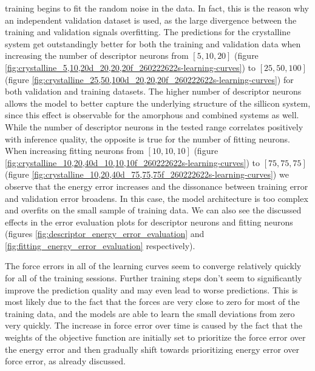 training begins to fit the random noise in the data. In fact, this is the
reason why an independent validation dataset is used, as the large divergence
between the training and validation signals overfitting.
The predictions for the crystalline system get outstandingly better for both
the training and validation data when increasing the number of descriptor
neurons from $[5, 10, 20]$ (figure
\ref{fig:crystalline_5,10,20d_20,20,20f_260222622s-learning-curves}) to
$[25, 50, 100]$ (figure
\ref{fig:crystalline_25,50,100d_20,20,20f_260222622s-learning-curves}) for
both validation and training datasets. The higher number of descriptor
neurons allows the model to better capture the underlying structure of the
sillicon system, since this effect is observable for the amorphous and
combined systems as well. While the number of descriptor neurons in the tested
range correlates positively with inference quality, the opposite is true for
the number of fitting neurons. When increasing fitting neurons from
$[10, 10, 10]$
(figure \ref{fig:crystalline_10,20,40d_10,10,10f_260222622s-learning-curves})
to $[75, 75, 75]$
(figure \ref{fig:crystalline_10,20,40d_75,75,75f_260222622s-learning-curves})
we observe that the energy error increases and the dissonance between
training error and validation error broadens. In this case, the model
architecture is too complex and overfits on the small sample of training data.
We can also see the discussed effects in the error evaluation plots for
descriptor neurons and fitting neurons (figures
\ref{fig:descriptor_energy_error_evaluation} and
\ref{fig:fitting_energy_error_evaluation} respectively).

The force errors in all of the learning curves seem to converge relatively
quickly for all of the training sessions. Further training steps don't seem to
significantly improve the prediction quality and may even lead to worse
predictions. This is most likely due to the fact that the forces are very
close to zero for most of the training data, and the models are able to learn
the small deviations from zero very quickly. The increase in force error over
time is caused by the fact that the weights of the objective function are
initially set to prioritize the force error over the energy error and then
gradually shift towards prioritizing energy error over force error, as already
discussed.

